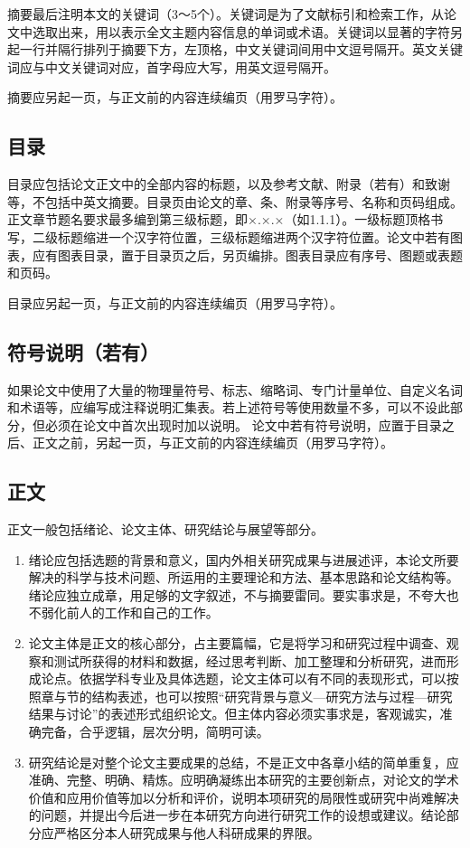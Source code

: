 摘要最后注明本文的关键词（3～5个）。关键词是为了文献标引和检索工作，从论文中选取出来，用以表示全文主题内容信息的单词或术语。关键词以显著的字符另起一行并隔行排列于摘要下方，左顶格，中文关键词间用中文逗号隔开。英文关键词应与中文关键词对应，首字母应大写，用英文逗号隔开。

摘要应另起一页，与正文前的内容连续编页（用罗马字符）。
\subsection{目录}
目录应包括论文正文中的全部内容的标题，以及参考文献、附录（若有）和致谢等，不包括中英文摘要。目录页由论文的章、条、附录等序号、名称和页码组成。正文章节题名要求最多编到第三级标题，即×.×.×（如1.1.1）。一级标题顶格书写，二级标题缩进一个汉字符位置，三级标题缩进两个汉字符位置。论文中若有图表，应有图表目录，置于目录页之后，另页编排。图表目录应有序号、图题或表题和页码。

目录应另起一页，与正文前的内容连续编页（用罗马字符）。
\subsection{符号说明（若有）}
如果论文中使用了大量的物理量符号、标志、缩略词、专门计量单位、自定义名词和术语等，应编写成注释说明汇集表。若上述符号等使用数量不多，可以不设此部分，但必须在论文中首次出现时加以说明。
论文中若有符号说明，应置于目录之后、正文之前，另起一页，与正文前的内容连续编页（用罗马字符）。
\subsection{正文}
正文一般包括绪论、论文主体、研究结论与展望等部分。

\begin{enumerate}
    \item 绪论应包括选题的背景和意义，国内外相关研究成果与进展述评，本论文所要解决的科学与技术问题、所运用的主要理论和方法、基本思路和论文结构等。绪论应独立成章，用足够的文字叙述，不与摘要雷同。要实事求是，不夸大也不弱化前人的工作和自己的工作。
    \item 论文主体是正文的核心部分，占主要篇幅，它是将学习和研究过程中调查、观察和测试所获得的材料和数据，经过思考判断、加工整理和分析研究，进而形成论点。依据学科专业及具体选题，论文主体可以有不同的表现形式，可以按照章与节的结构表述，也可以按照“研究背景与意义—研究方法与过程—研究结果与讨论”的表述形式组织论文。但主体内容必须实事求是，客观诚实，准确完备，合乎逻辑，层次分明，简明可读。
    \item 研究结论是对整个论文主要成果的总结，不是正文中各章小结的简单重复，应准确、完整、明确、精炼。应明确凝练出本研究的主要创新点，对论文的学术价值和应用价值等加以分析和评价，说明本项研究的局限性或研究中尚难解决的问题，并提出今后进一步在本研究方向进行研究工作的设想或建议。结论部分应严格区分本人研究成果与他人科研成果的界限。
\end{enumerate}
